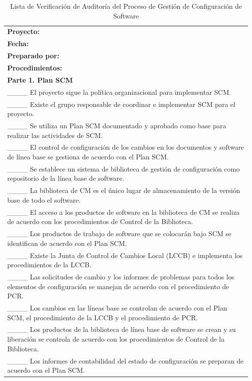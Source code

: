 \begin{table}[H]
\centering
\caption{Lista de Verificación de Auditoría del Proceso de Gestión de Configuración de Software}
\label{fig:b17}
\begin{tabular}{|p{14cm}|}
\hline
\textbf{Proyecto:} \\
\textbf{Fecha:} \\
\textbf{Preparado por:} \\
\hline
\textbf{Procedimientos:} \\
\textbf{Parte 1. Plan SCM} \\
\_\_\_\_ El proyecto sigue la política organizacional para implementar SCM. \\
\_\_\_\_ Existe el grupo responsable de coordinar e implementar SCM para el proyecto. \\
\_\_\_\_ Se utiliza un Plan SCM documentado y aprobado como base para realizar las actividades de SCM. \\
\_\_\_\_ El control de configuración de los cambios en los documentos y software de línea base se gestiona de acuerdo con el Plan SCM. \\
\_\_\_\_ Se establece un sistema de biblioteca de gestión de configuración como repositorio de la línea base de software. \\
\_\_\_\_ La biblioteca de CM es el único lugar de almacenamiento de la versión base de todo el software. \\
\_\_\_\_ El acceso a los productos de software en la biblioteca de CM se realiza de acuerdo con los procedimientos de Control de la Biblioteca. \\
\_\_\_\_ Los productos de trabajo de software que se colocarán bajo SCM se identifican de acuerdo con el Plan SCM. \\
\_\_\_\_ Existe la Junta de Control de Cambios Local (LCCB) e implementa los procedimientos de la LCCB. \\
\_\_\_\_ Las solicitudes de cambio y los informes de problemas para todos los elementos de configuración se manejan de acuerdo con el procedimiento de PCR. \\
\_\_\_\_ Los cambios en las líneas base se controlan de acuerdo con el Plan SCM, el procedimiento de la LCCB y el procedimiento de PCR. \\
\_\_\_\_ Los productos de la biblioteca de línea base de software se crean y su liberación se controla de acuerdo con los procedimientos de Control de la Biblioteca. \\
\_\_\_\_ Los informes de contabilidad del estado de configuración se preparan de acuerdo con el Plan SCM. \\

\end{tabular}
\end{table}
